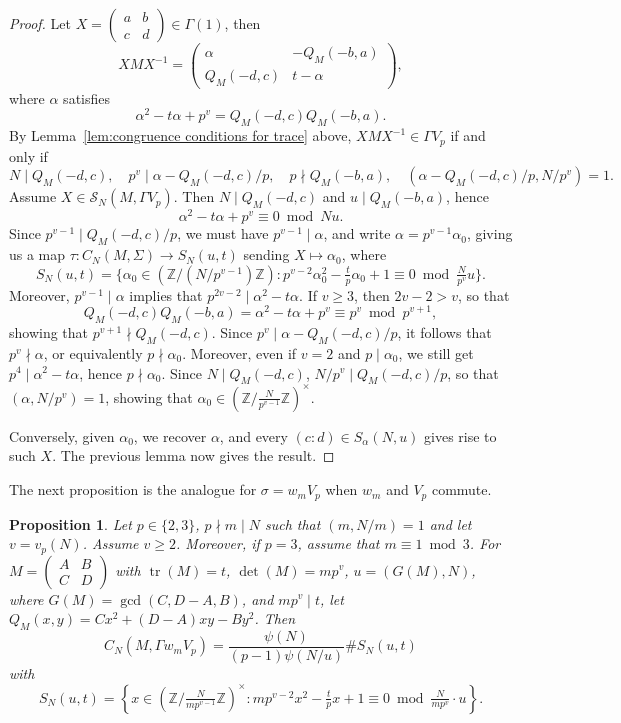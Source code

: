 \documentclass[12pt]{amsart}
\newcommand{\Z}{\mathbb{Z}}
\newcommand{\calS}{\mathcal{S}}
\DeclareMathOperator{\tr}{tr}
\numberwithin{equation}{subsection}
\theoremstyle{plain}\newtheorem{ithm}{Theorem}
\theoremstyle{plain}\newtheorem{iprop}[ithm]{Proposition}
\newtheorem{proposition}[equation]{Proposition}
\theoremstyle{definition}
\theoremstyle{remark}
\newcommand{\mattwo}[4]{\left( \begin{array}{cc} {#1} & {#2} \\ {#3} & {#4} \end{array} \right)}
\begin{document}
\begin{proof}
    Let $X = \mattwo{a}{b}{c}{d} \in \Gamma(1)$, then
    $$
     X M X^{-1} = \mattwo{\alpha}{-Q_M(-b,a)}{Q_M(-d,c)}{t-\alpha}, 
    $$
    where $\alpha$ satisfies
    $$
    \alpha^2 - t \alpha + p^v = Q_M(-d, c) Q_M(-b, a).
    $$
    By Lemma~\ref{lem:congruence conditions for trace} above, $XMX^{-1} \in \Gamma V_p$ if and only if 
    $$
    N \mid Q_M(-d,c), \quad p^v \mid \alpha - Q_M(-d,c)/p, \quad  p \nmid Q_M(-b,a), \quad (\alpha - Q_M(-d,c)/p, N/p^v) = 1.
    $$
    Assume $X \in \calS_N(M, \Gamma V_p)$. Then $N \mid Q_M(-d,c)$ and $u \mid Q_M(-b,a)$, hence 
    $$
    \alpha^2 - t \alpha + p^v \equiv 0 \bmod Nu.
    $$
    Since $p^{v-1} \mid Q_M(-d,c)/p$, we must have $p^{v-1} \mid \alpha$, and write $\alpha = p^{v-1} \alpha_0$, 
    giving us a map $\tau : C_N(M, \Sigma) \to S_N(u,t)$ sending $X \mapsto \alpha_0$, where
    $$
    S_N(u,t) = \{ \alpha_0 \in (\Z / (N/p^{v-1}) \Z) : p^{v-2} \alpha_0^2 - \tfrac{t}{p} \alpha_0 + 1 \equiv 0 \bmod \tfrac{N}{p^v} u\}.
    $$
    Moreover, $p^{v-1} \mid \alpha$ implies that $p^{2v-2} \mid \alpha^2 - t\alpha $. 
    If $v \ge 3$, then $2v-2 > v$, so that 
    $$ 
    Q_M(-d, c) Q_M(-b, a) = \alpha^2 - t \alpha + p^v \equiv p^v \bmod p^{v+1}, 
    $$
    showing that $p^{v+1} \nmid Q_M(-d,c)$. Since $p^v \mid \alpha - Q_M(-d,c)/p$, it follows that $p^v \nmid \alpha$, or equivalently $p \nmid \alpha_0$. Moreover, even if $v = 2$ and $p \mid \alpha_0$, we still get $p^4 \mid \alpha^2 - t \alpha$, hence $p \nmid \alpha_0$.
    Since $N \mid Q_M(-d,c)$, $N/p^v \mid Q_M(-d,c)/p$, so that $(\alpha, N/p^v) = 1$, showing that $\alpha_0 \in \left( \Z / \tfrac{N}{p^{v-1}} \Z \right)^{\times}$.
    
    Conversely, given $\alpha_0$, we recover $\alpha$, and every $(c:d) \in S_{\alpha}(N,u)$ gives rise to such $X$. The previous lemma now gives the result.
\end{proof}

The next proposition is the analogue for $\sigma = w_m V_p$ when $w_m$ and $V_p$ commute.

\begin{proposition} Let $p \in \{2,3\}$, $p \nmid m \mid N$ such that $(m, N/m) = 1$ and let $v = v_p(N)$. Assume $v \ge 2$. Moreover, if $p = 3$, assume that $m \equiv 1 \bmod 3$.
    For $M = \mattwo{A}{B}{C}{D}$ with $\tr(M) = t$, $\det(M) = mp^v$, $u = (G(M),N)$, where $G(M) = \gcd(C, D-A, B)$, and $mp^v \mid t$, let $Q_M(x,y) = Cx^2 + (D-A)xy -By^2$. Then
   \begin{equation}
    C_N(M,  \Gamma w_mV_p) = \frac{\psi(N)}{(p-1)\psi(N/u)} \# S_N(u,t)
   \end{equation}
   with
   $$
   S_N(u,t) = \left \{ x \in \left( \Z / \tfrac{N}{mp^{v-1}} \Z \right)^{\times} : 
    mp^{v-2} x^2 - \tfrac{t}{p} x + 1 \equiv 0 \bmod \tfrac{N}{mp^v} \cdot u\right\}.
   $$
\end{proposition}
\end{document}
